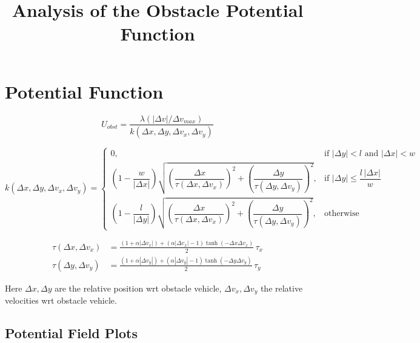 \documentclass[11pt]{article}
\title{\textcolor{accent}{\textbf{Analysis of the Obstacle Potential Function}}}
\author{}
\date{}
\begin{document}
\maketitle
\vspace{-1.5em}

\vspace{1em}

\section{Potential Function}

\begin{equation}
    U_{obst} = \frac{\lambda (|\Delta v| / \Delta v_{max})}
    {k(\Delta x, \Delta y, \Delta v_x, \Delta v_y)}
    \label{eq:potential}
\end{equation}

\begin{equation}
    k(\Delta x, \Delta y, \Delta v_x, \Delta v_y) =
    \begin{cases}
        0, & \text{if } |\Delta y| < l \text{ and } |\Delta x| < w \\[4pt]
        \left(1 - \dfrac{w}{|\Delta x|}\right) \sqrt{\left(\dfrac{\Delta x}{\tau(\Delta x, \Delta v_x)}\right)^2 + \left(\dfrac{\Delta y}{\tau(\Delta y, \Delta v_y)}\right)^2}, & \text{if } |\Delta y| \leq \dfrac{l\,|\Delta x|}{w} \\[8pt]
        \left(1 - \dfrac{l}{|\Delta y|}\right) \sqrt{\left(\dfrac{\Delta x}{\tau(\Delta x, \Delta v_x)}\right)^2 + \left(\dfrac{\Delta y}{\tau(\Delta y, \Delta v_y)}\right)^2}, & \text{otherwise}
    \end{cases}
    \label{eq:k-prime}
\end{equation}

\begin{align}
    \tau(\Delta x, \Delta v_x) &= \frac{(1 + \alpha |\Delta v_x|) + (\alpha |\Delta v_x| - 1)\tanh(-\Delta x \Delta v_x)}{2}\,\tau_x \\
    \tau(\Delta y, \Delta v_y) &= \frac{(1 + \alpha |\Delta v_y|) + (\alpha |\Delta v_y| - 1)\tanh(-\Delta y \Delta v_y)}{2}\,\tau_y
\end{align}

\noindent
Here $\Delta x, \Delta y$ are the relative position wrt obstacle vehicle, $\Delta v_x, \Delta v_y$ the relative velocities wrt obstacle vehicle.

\subsection{Potential Field Plots}
\end{document}
